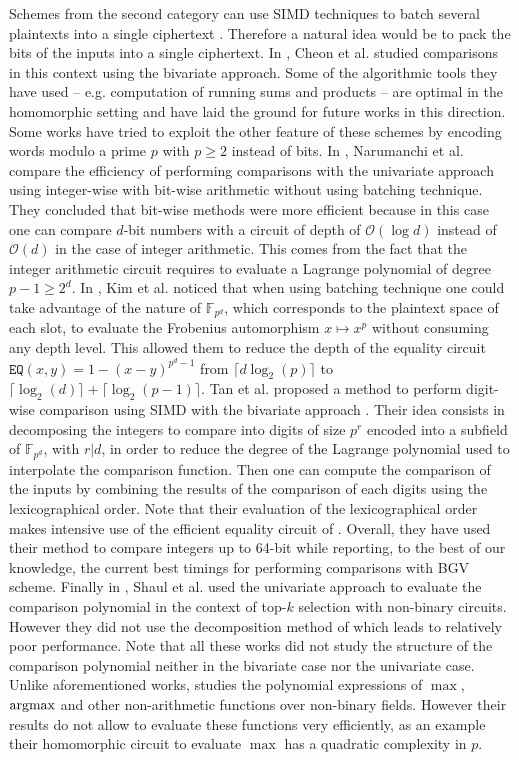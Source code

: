 Schemes from the second category can use \ac{SIMD} techniques to batch several plaintexts into a single ciphertext \cite{SV14}. Therefore a natural idea would be to pack the bits of the inputs into a single ciphertext. In \cite{CKK15,CKK16}, Cheon et al. studied comparisons in this context using the bivariate approach. Some of the algorithmic tools they have used -- e.g. computation of running sums and products -- are optimal in the homomorphic setting and have laid the ground for future works in this direction.
Some works have tried to exploit the other feature of these schemes by encoding words modulo a prime $p$ with $p\geq 2$ instead of bits. In \cite{NGEG17}, Narumanchi et al. compare the efficiency of performing comparisons with the univariate approach using integer-wise with bit-wise arithmetic without using batching technique. They concluded that bit-wise methods were more efficient because in this case one can compare $d$-bit numbers with a circuit of depth of $\mathcal{O}(\log d)$ instead of $\mathcal{O}(d)$ in the case of integer arithmetic. This comes from the fact that the integer arithmetic circuit requires to evaluate a Lagrange polynomial of degree $p-1 \geq 2^d$.
In \cite{KLLW18}, Kim et al. noticed that when using batching technique one could take advantage of the nature of $\mathbb{F}_{p^d}$, which corresponds to the plaintext space of each slot, to evaluate the Frobenius automorphism $x \mapsto x^{p}$ without consuming any depth level. This allowed them to reduce the depth of the equality circuit $\texttt{EQ}(x,y) = 1 - (x-y)^{p^{d}-1}$ from $\lceil d\log_2(p) \rceil$ to $\lceil \log_2(d)\rceil + \lceil\log_2(p-1)\rceil$.
Tan et al. proposed a method to perform digit-wise comparison using \ac{SIMD} with the bivariate approach \cite{TLWRK20}. Their idea consists in decomposing the integers to compare into digits of size $p^r$ encoded into a subfield of $\mathbb{F}_{p^d}$, with $r | d$, in order to reduce the degree of the Lagrange polynomial used to interpolate the comparison function. Then one can compute the comparison of the inputs by combining the results of the comparison of each digits using the lexicographical order. Note that their evaluation of the lexicographical order makes intensive use of the efficient equality circuit of \cite{KLLW18}. Overall, they have used their method to compare integers up to 64-bit while reporting, to the best of our knowledge, the current best timings for performing comparisons with BGV scheme. Finally in \cite{PoPETS:SFR20}, Shaul et al. used the univariate approach to evaluate the comparison polynomial in the context of top-$k$ selection with non-binary circuits. However they did not use the decomposition method of \cite{TLWRK20} which leads to relatively poor performance.
Note that all these works did not study the structure of the comparison polynomial neither in the bivariate case nor the univariate case. Unlike aforementioned works, \cite{JMC:KMNN19} studies the polynomial expressions of $\max$, $\operatorname{argmax}$ and other non-arithmetic functions over non-binary fields. However their results do not allow to evaluate these functions very efficiently, as an example their homomorphic circuit to evaluate $\max$ has a quadratic complexity in $p$.

